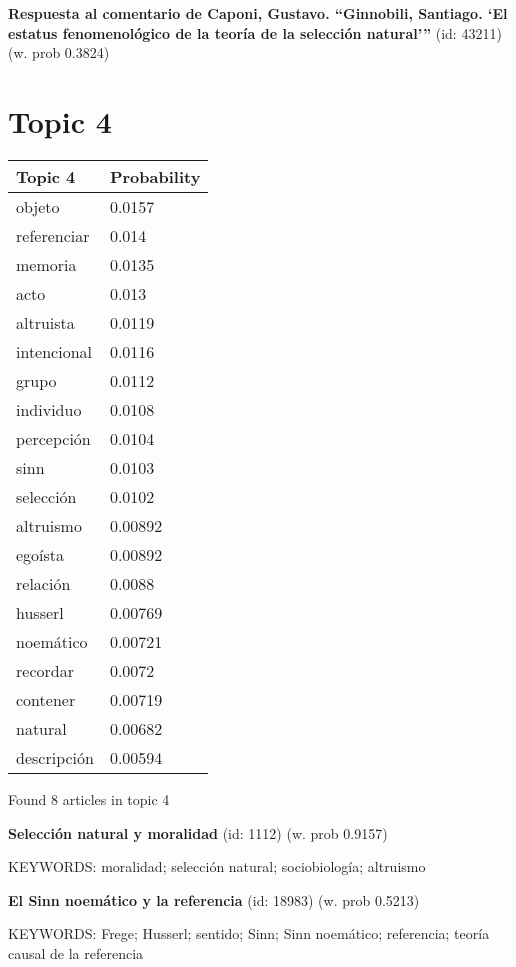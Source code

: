 \documentclass{article}
\begin{document}
\textbf{Respuesta al comentario de Caponi, Gustavo.  “Ginnobili, Santiago. ‘El estatus fenomenológico  de la teoría de la selección natural’”} (id: 43211)
 (w. prob 0.3824)

\vfill
\newpage


\centering
\thispagestyle{empty}
\section*{Topic 4}\vfill
\begin{tabular}{ll}
\toprule
     Topic 4 & Probability \\
\midrule
      objeto &      0.0157 \\
 referenciar &       0.014 \\
     memoria &      0.0135 \\
        acto &       0.013 \\
   altruista &      0.0119 \\
 intencional &      0.0116 \\
       grupo &      0.0112 \\
   individuo &      0.0108 \\
  percepción &      0.0104 \\
        sinn &      0.0103 \\
   selección &      0.0102 \\
   altruismo &     0.00892 \\
     egoísta &     0.00892 \\
    relación &      0.0088 \\
     husserl &     0.00769 \\
   noemático &     0.00721 \\
    recordar &      0.0072 \\
    contener &     0.00719 \\
     natural &     0.00682 \\
 descripción &     0.00594 \\
\bottomrule
\end{tabular}

\vfill
Found 8 articles in topic 4
\vfill

\textbf{Selección natural y moralidad} (id: 1112)
 (w. prob 0.9157)


KEYWORDS:
moralidad; selección natural; sociobiología; altruismo
\vfill

\textbf{El Sinn noemático y la referencia} (id: 18983)
 (w. prob 0.5213)


KEYWORDS:
Frege; Husserl; sentido; Sinn; Sinn noemático; referencia; teoría causal de la referencia
\vfill
\end{document}
